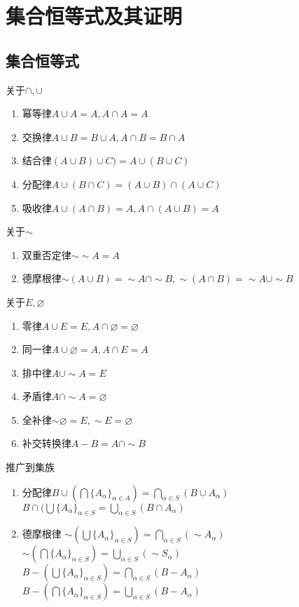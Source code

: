 \documentclass{book}
\newcommand{\no}{\varnothing}
\begin{document}
\else
\chapter{集合恒等式及其证明}
\fi
\section{集合恒等式}
\noindent
关于$\cap, \cup$
\begin{enumerate}
    \item 幂等律\quad $A\cup A=A, A\cap A=A$
    \item 交换律\quad $A\cup B=B\cup A, A\cap B=B\cap A$
    \item 结合律\quad $(A\cup B)\cup C)=A\cup (B\cup C)$
    \item 分配律\quad $A\cup (B\cap C)=(A\cup B)\cap (A\cup C)$ 
    \item 吸收律\quad $A\cup (A\cap B)=A, A\cap (A\cup B)=A$
\end{enumerate}
关于$\sim$
\begin{enumerate}
    \item 双重否定律\quad $\sim\sim A=A$
    \item 德摩根律\quad $\sim (A\cup B)=\sim A\cap \sim B, \sim (A\cap B)=\sim A\cup \sim B$
\end{enumerate}
关于$E, \no$
\begin{enumerate}
    \item 零律\quad $A\cup E=E, A\cap\no=\no$
    \item 同一律\quad $A\cup\no=A, A\cap E=A$
    \item 排中律\quad $A\cup\sim A=E$
    \item 矛盾律\quad $A\cap\sim A=\no$
    \item 全补律\quad $\sim\no=E,\sim E=\no$
    \item 补交转换律\quad $A-B=A\cap\sim B$
\end{enumerate}
推广到集族
\begin{enumerate}
    \item 分配律\quad $B\cup (\bigcap\{A_\alpha\}_{\alpha\in A})=\bigcap_{\alpha\in S}(B\cup A_\alpha)$\\
        $B\cap (\bigcup\{A_\alpha\}_{\alpha\in S}=\bigcup_{\alpha\in S}(B\cap A_\alpha)$
     \item 德摩根律 $\sim (\bigcup\{A_\alpha\}_{\alpha\in S})=\bigcap_{\alpha\in S}(\sim A_\alpha)$\\
        $\sim (\bigcap\{A_\alpha\}_{\alpha\in S})=\bigcup_{\alpha\in S}(\sim S_\alpha)$\\
        $B-(\bigcup\{A_\alpha\}_{\alpha\in S})=\bigcap_{\alpha\in S}(B-A_\alpha)$\\
        $B-(\bigcap\{A_\alpha\}_{\alpha\in S})=\bigcup_{\alpha\in S}(B-A_\alpha)$
\end{enumerate}
\end{document}
